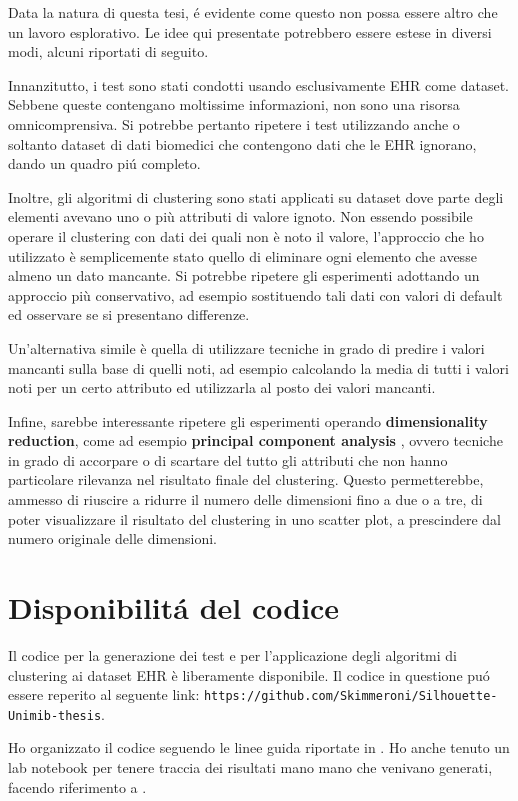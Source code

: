 \documentclass[a4paper, 12pt]{report}
\begin{document}
		Data la natura di questa tesi, é evidente come questo non possa
		essere altro che un lavoro esplorativo. Le idee qui presentate
		potrebbero essere estese in diversi modi, alcuni riportati di
		seguito.

		Innanzitutto, i test sono stati condotti usando esclusivamente EHR
		come dataset. Sebbene queste contengano moltissime informazioni, non
		sono una risorsa omnicomprensiva. Si potrebbe pertanto ripetere i
		test utilizzando anche o soltanto dataset di dati biomedici che
		contengono dati che le EHR ignorano, dando un quadro piú completo.

		Inoltre, gli algoritmi di clustering sono stati applicati su dataset
		dove parte degli elementi avevano uno o più attributi di valore
		ignoto. Non essendo possibile operare il clustering con dati dei
		quali non è noto il valore, l'approccio che ho utilizzato è
		semplicemente stato quello di eliminare ogni elemento che avesse
		almeno un dato mancante. Si potrebbe ripetere gli esperimenti
		adottando un approccio più conservativo, ad esempio sostituendo
		tali dati con valori di default ed osservare se si presentano
		differenze.

		Un'alternativa simile è quella di utilizzare tecniche in grado di
		predire i valori mancanti sulla base di quelli noti, ad esempio
		calcolando la media di tutti i valori noti per un certo attributo
		ed utilizzarla al posto dei valori mancanti.

		Infine, sarebbe interessante ripetere gli esperimenti operando
		\textbf{dimensionality reduction}, come ad esempio \textbf{principal
		component analysis} \cite{Hotelling1933AnalysisOA}, ovvero tecniche
		in grado di accorpare o di scartare del tutto gli attributi che non
		hanno particolare rilevanza nel risultato finale del clustering.
		Questo permetterebbe, ammesso di riuscire a ridurre il numero delle
		dimensioni fino a due o a tre, di poter visualizzare il risultato
		del clustering in uno scatter plot, a prescindere dal numero originale
		delle dimensioni.

	\chapter*{Disponibilitá del codice}

		Il codice per la generazione dei test e per l'applicazione degli
		algoritmi di clustering ai dataset EHR è liberamente disponibile.
		Il codice in questione puó essere reperito al seguente link:
		\texttt{https://github.com/Skimmeroni/Silhouette-Unimib-thesis}.

		Ho organizzato il codice seguendo le linee guida riportate in
		\cite{10.1371/journal.pcbi.1000424}. Ho anche tenuto un lab
		notebook per tenere traccia dei risultati mano mano che venivano
		generati, facendo riferimento a \cite{10.1371/journal.pcbi.1004385}.

	\printbibliography
\end{document}
